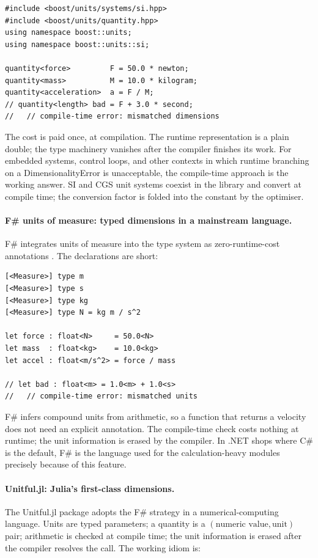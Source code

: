 \begin{verbatim}
#include <boost/units/systems/si.hpp>
#include <boost/units/quantity.hpp>
using namespace boost::units;
using namespace boost::units::si;

quantity<force>         F = 50.0 * newton;
quantity<mass>          M = 10.0 * kilogram;
quantity<acceleration>  a = F / M;
// quantity<length> bad = F + 3.0 * second;
//   // compile-time error: mismatched dimensions
\end{verbatim}

The cost is paid once, at compilation. The runtime representation
is a plain double; the type machinery vanishes after the compiler
finishes its work. For embedded systems, control loops, and other
contexts in which runtime branching on a DimensionalityError is
unacceptable, the compile-time approach is the working answer.
SI and CGS unit systems coexist in the library and convert at
compile time; the conversion factor is folded into the constant by
the optimiser.

\paragraph{F\# units of measure: typed dimensions in a mainstream language.}
F\# integrates units of measure into the type system as
zero-runtime-cost annotations \cite{web:ch02t3-fsharp-units}. The
declarations are short:

\begin{verbatim}
[<Measure>] type m
[<Measure>] type s
[<Measure>] type kg
[<Measure>] type N = kg m / s^2

let force : float<N>     = 50.0<N>
let mass  : float<kg>    = 10.0<kg>
let accel : float<m/s^2> = force / mass

// let bad : float<m> = 1.0<m> + 1.0<s>
//   // compile-time error: mismatched units
\end{verbatim}

F\# infers compound units from arithmetic, so a function that
returns a velocity does not need an explicit annotation. The
compile-time check costs nothing at runtime; the unit information
is erased by the compiler. In .NET shops where C\# is the default,
F\# is the language used for the calculation-heavy modules
precisely because of this feature.

\paragraph{Unitful.jl: Julia's first-class dimensions.}
The Unitful.jl package \cite{web:ch02t3-unitful} adopts the F\#
strategy in a numerical-computing language. Units are typed
parameters; a quantity is a $(\text{numeric value}, \text{unit})$
pair; arithmetic is checked at compile time; the unit information
is erased after the compiler resolves the call. The working idiom is:

